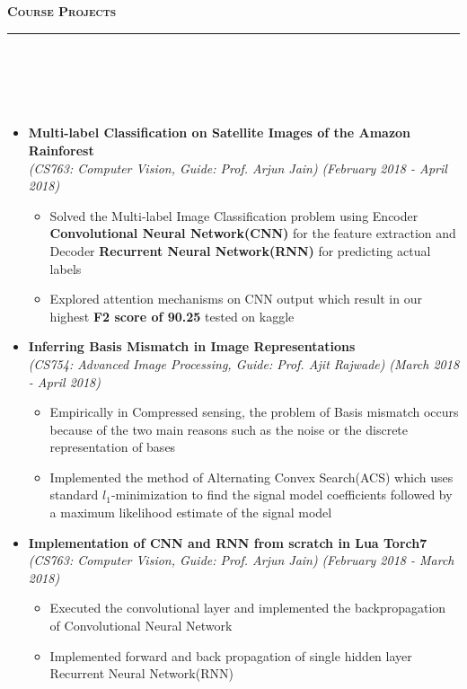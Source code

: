 \documentclass[a4paper,10pt]{article}
\newcommand{\isep}{-2 pt}
\newcommand{\lsep}{-0.5cm}
\newcommand{\resheading}[1]{{\small
        {
            \begin{minipage}
                {0.992\textwidth}\textbf{{\textsc{#1 \vphantom{p\^{E}} }}}
                \\[-0.3cm]
                \hrule
            \end{minipage}
            \\[-0.5cm]
        }
 }}
\begin{document}
\resheading{\textbf{\large Course Projects}}\\[\lsep]
\\[-0.2cm]
\begin{itemize}

\item \textbf{Multi-label Classification on Satellite Images of the Amazon Rainforest} \\ \emph{(CS763: Computer Vision, Guide: Prof. Arjun Jain)} \hfill {\emph{(February 2018 - April 2018)}}
    \\ [-0.6cm]
    \begin{itemize}\itemsep \isep
    \item Solved the Multi-label Image Classification problem using Encoder \textbf{Convolutional Neural Network(CNN)} for the feature extraction and Decoder \textbf{Recurrent Neural Network(RNN)} for predicting actual labels
    \item Explored attention mechanisms on CNN output which result in our highest \textbf{F2 score of 90.25} tested on kaggle
    \end{itemize}

\item \textbf{Inferring Basis Mismatch in Image Representations} \\ {\emph{(CS754: Advanced Image Processing, Guide: Prof. Ajit Rajwade)}} \hfill {\emph{(March 2018 - April 2018)}}
    \\ [-0.6cm]
    \begin{itemize}\itemsep \isep
    \item Empirically in Compressed sensing, the problem of Basis mismatch occurs because of the two main reasons such as the noise or the discrete representation of bases 
    \item Implemented the method of Alternating Convex Search(ACS) which uses standard $l_1$-minimization to find the signal model coefficients followed by a maximum likelihood estimate of the signal model
    \end{itemize}

\item \textbf{Implementation of CNN and RNN from scratch in Lua Torch7} \\
    {\emph{(CS763: Computer Vision, Guide: Prof. Arjun Jain)}} \hfill {\emph{(February 2018 - March 2018)}}
    \\ [-0.6cm]
    \begin{itemize}\itemsep \isep
    \item Executed the convolutional layer and implemented the backpropagation of Convolutional Neural Network
    \item Implemented forward and back propagation of single hidden layer Recurrent Neural Network(RNN)
    \end{itemize}


\end{itemize}
\end{document}
